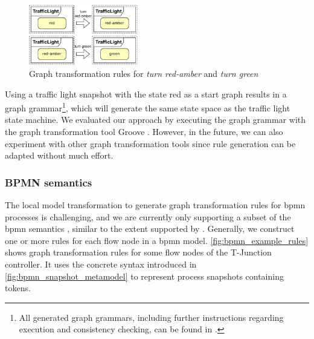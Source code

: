 \documentclass{jot}
\begin{document}
\begin{figure}[h]
    \centering
    \includegraphics[width=0.425\textwidth]{figures/sm_rules.pdf}
    \caption{Graph transformation rules for \emph{turn red-amber} and \emph{turn green}}
    \label{fig:sm_rules}
\end{figure}

Using a traffic light snapshot with the state red as a start graph results in a graph grammar\footnote{\label{footnote:GGinRepo}All generated graph grammars, including further instructions regarding execution and consistency checking, can be found in \cite{krauterArtifactsBehavioralConsistency2022}.}, which will generate the same state space as the traffic light state machine.
We evaluated our approach by executing the graph grammar with the graph transformation tool Groove \cite{ghamarianModellingAnalysisUsing2012, rensinkGROOVESimulatorTool2004}.
However, in the future, we can also experiment with other graph transformation tools since rule generation can be adapted without much effort.


\subsubsection{BPMN semantics}
The local model transformation to generate graph transformation rules for \gls*{bpmn} processes is challenging, and we are currently only supporting a subset of the \gls*{bpmn} semantics \cite{krauterFormalizationAnalysisBPMN2022}, similar to the extent supported by \cite{vangorpVisualTokenbasedFormalization2013}.
Generally, we construct one or more rules for each flow node in a \gls*{bpmn} model.
\autoref{fig:bpmn_example_rules} shows graph transformation rules for some flow nodes of the T-Junction controller.
It uses the concrete syntax introduced in \cref{fig:bpmn_snapshot_metamodel} to represent process snapshots containing tokens.
\end{document}
